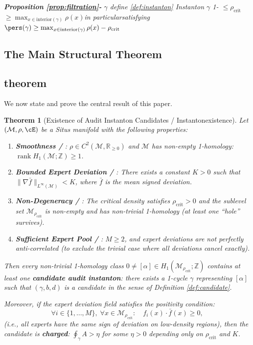 \documentclass[11pt,a4paper]{article}
\theoremstyle{plain}
\newtheorem{theorem}{Theorem}[section]
\theoremstyle{definition}
\DeclareMathOperator{\rank}{rank}
\newcommand{\R}{\mathbb{R}}
\newcommand{\Z}{\mathbb{Z}}
\newcommand{\cM}{\mathcal{M}}
\begin{document}
\bigskip
\noindent
\textit{\textbf{Proposition \ref{prop:filtration}-} $\gamma$ define \ref{def:instanton} Instanton $\gamma$ 1- $\leq \rho_{\text{crit}}$ $\geq \max_{x \in \text{interior}(\gamma)} \rho(x)$in particularsatisfying $\pers(\gamma) \geq \max_{x \in \text{interior}(\gamma)} \rho(x) - \rho_{\text{crit}}$}

\subsection{The Main Structural Theorem}
\subsection*{theorem}

We now state and prove the central result of this paper.

\begin{theorem}[Existence of Audit Instanton Candidates / Instantonexistence]
\label{thm:main}
Let $(\cM, \rho, \cE)$ be a Situs manifold with the following properties:
\begin{enumerate}[label=(H\arabic*)]
  \item \textbf{Smoothness / }: $\rho \in C^2(\cM, \R_{\geq 0})$ and 
        $\cM$ has non-empty 1-homology: $\rank H_1(\cM; \Z) \geq 1$.
  \item \textbf{Bounded Expert Deviation / }: There exists 
        a constant $K > 0$ such that $\|\nabla \bar{f}\|_{L^{\infty}(\cM)} < K$, 
        where $\bar{f}$ is the mean signed deviation.
  \item \textbf{Non-Degeneracy / }: The critical density satisfies 
        $\rho_{\text{crit}} > 0$ and the sublevel set 
        $\cM_{\rho_{\text{crit}}}$ is non-empty and has non-trivial 
        1-homology (at least one ``hole'' survives).
  \item \textbf{Sufficient Expert Pool / }: $M \geq 2$, and 
        expert deviations are not perfectly anti-correlated (to exclude 
        the trivial case where all deviations cancel exactly).
\end{enumerate}

Then every non-trivial 1-homology class 
$0 \neq [\alpha] \in H_1(\cM_{\rho_{\text{crit}}}; \Z)$ contains at least 
one \textbf{candidate audit instanton}: there exists a 1-cycle 
$\gamma$ representing $[\alpha]$ such that $(\gamma, b, d)$ is a candidate 
in the sense of Definition \ref{def:candidate}.

Moreover, if the expert deviation field satisfies the \emph{positivity 
condition}:
\begin{equation}
  \forall i \in \{1,\ldots,M\}, \; \forall x \in \cM_{\rho_{\text{crit}}}:
  \quad f_i(x) \cdot \bar{f}(x) \geq 0,
  \label{eq:positivity}
\end{equation}
(i.e., all experts have the same sign of deviation on low-density regions), 
then the candidate is \textbf{charged}: $\oint_{\gamma} A > \eta$ for some 
$\eta > 0$ depending only on $\rho_{\text{crit}}$ and $K$.
\end{theorem}
\end{document}
